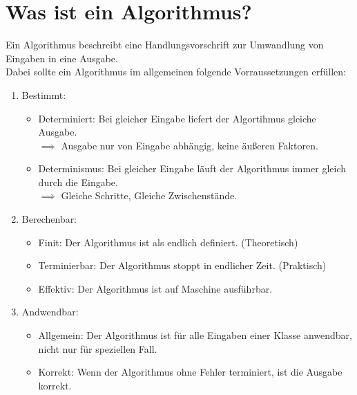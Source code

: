 \documentclass[
../AuD-Zusammenfassung.tex,
]
{subfiles}
\begin{document}
\section{Was ist ein Algorithmus?}
Ein Algorithmus beschreibt eine Handlungsvorschrift zur Umwandlung von Eingaben in eine Ausgabe.\\
Dabei sollte ein Algorithmus im allgemeinen folgende Vorraussetzungen erfüllen:
\begin{enumerate}
    \item Bestimmt:
    \begin{itemize}
        \item Determiniert: Bei gleicher Eingabe liefert der Algortihmus gleiche Ausgabe. \\$\implies$ Ausgabe nur von Eingabe abhängig, keine äußeren Faktoren.
        \item Determinismus: Bei gleicher Eingabe läuft der Algorithmus immer gleich durch die Eingabe. \\$\implies$ Gleiche Schritte, Gleiche Zwischenstände.
    \end{itemize}
    \item Berechenbar:
    \begin{itemize}
        \item Finit: Der Algorithmus ist als endlich definiert. (Theoretisch)
        \item Terminierbar: Der Algorithmus stoppt in endlicher Zeit. (Praktisch)
        \item Effektiv: Der Algorithmus ist auf Maschine ausführbar.
    \end{itemize}
    \item Andwendbar:
    \begin{itemize}
        \item Allgemein: Der Algorithmus ist für alle Eingaben einer Klasse anwendbar, nicht nur für speziellen Fall.
        \item Korrekt: Wenn der Algorithmus ohne Fehler terminiert, ist die Ausgabe korrekt.
    \end{itemize}
\end{enumerate}
\end{document}
